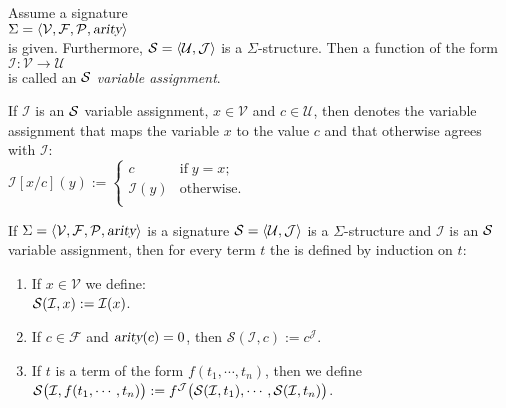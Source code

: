 \begin{Definition}
    Assume a signature \\[0.2cm]
    \hspace*{1.3cm} $\Sigma = \langle \mathcal{V}, \mathcal{F}, \mathcal{P}, \textsl{arity} \rangle$ \\[0.2cm]
    is given.  Furthermore,  $\mathcal{S} = \langle \mathcal{U}, \mathcal{J} \rangle$ is a  $\Sigma$-structure.
    Then a function of the form \\[0.2cm]
    \hspace*{1.3cm} $\mathcal{I}: \mathcal{V} \rightarrow \mathcal{U}$ \\[0.2cm]
    is called an {\color{blue}$\mathcal{S}$ \emph{variable assignment}}.

    If  $\mathcal{I}$ is an $\mathcal{S}$ variable assignment, 
    $x \in \mathcal{V}$ and $c \in \mathcal{U}$, then  denotes the variable assignment
    that maps the variable  $x$ to the value $c$ and that otherwise agrees with $\mathcal{I}$: \\[0.2cm]
    \hspace*{1.3cm} 
    $\mathcal{I}[x/c](y) := \left\{
    \begin{array}{ll}
    c               & \mbox{if}\; y = x;  \\
    \mathcal{I}(y)  & \mbox{otherwise}.          \\
    \end{array}
    \right.$ \eox
\end{Definition}


\begin{Definition}
  If $\Sigma = \langle \mathcal{V}, \mathcal{F}, \mathcal{P}, \textsl{arity} \rangle$ is a signature
  $\struct = \pair(\mathcal{U},\mathcal{J})$ is a  $\Sigma$-structure and $\mathcal{I}$ is an  $\mathcal{S}$
    variable assignment, then for every term $t$ the  
     is defined by induction on $t$:
    \begin{enumerate}
    \item If $x \in \mathcal{V}$ we define: \\[0.2cm]
          \hspace*{1.3cm} $\mathcal{S}(\mathcal{I}, x) := \mathcal{I}(x)$.
    \item If $c \in \mathcal{F}$ and $\textsl{arity}(c) = 0$, then $\mathcal{S}(\mathcal{I}, c) := c^\mathcal{J}$.
    \item If $t$ is a term of the form $f(t_1,\cdots,t_n)$, then we define \\[0.2cm]
          \hspace*{1.3cm} $\mathcal{S}\bigl(\mathcal{I}, f(t_1,\cdots,t_n)\bigr) := 
                           f^\mathcal{J}\bigl( \mathcal{S}(\mathcal{I}, t_1), \cdots, \mathcal{S}(\mathcal{I}, t_n) \bigr)$.
                           \eox
    \end{enumerate}
\end{Definition}

